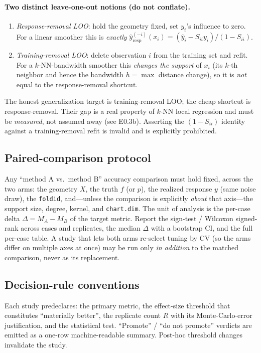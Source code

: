 \documentclass[11pt]{article}
\newcommand{\code}[1]{\texttt{#1}}
\begin{document}
\paragraph{Two distinct leave-one-out notions (do not conflate).}
\begin{enumerate}[leftmargin=1.4em]
\item \emph{Response-removal LOO}: hold the geometry fixed, set $y_i$'s influence to zero.
For a linear smoother this is \emph{exactly} $\hat y^{(-i)}_{\mathrm{resp}}(x_i)=(\hat y_i - S_{ii}y_i)/(1-S_{ii})$.
\item \emph{Training-removal LOO}: delete observation $i$ from the training set and refit.
For a $k$-NN-bandwidth smoother this \emph{changes the support} of $x_i$ (its $k$-th neighbor
and hence the bandwidth $h=\max$ distance change), so it is \emph{not} equal to the
response-removal shortcut.
\end{enumerate}
The honest generalization target is training-removal LOO; the cheap shortcut is
response-removal. Their gap is a real property of $k$-NN local regression and must be
\emph{measured}, not assumed away (see E0.3b). Asserting the $(1-S_{ii})$ identity against a
training-removal refit is invalid and is explicitly prohibited.

\subsection{Paired-comparison protocol}
\label{sec:paired}

Any ``method A vs.\ method B'' accuracy comparison must hold fixed, across the two arms:
the geometry $X$, the truth $f$ (or $p$), the realized response $y$ (same noise draw), the
\code{foldid}, and—unless the comparison is explicitly \emph{about} that axis—the support
size, degree, kernel, and \code{chart.dim}. The unit of analysis is the per-case delta
$\Delta = M_A - M_B$ of the target metric. Report the sign-test / Wilcoxon signed-rank
across cases and replicates, the median $\Delta$ with a bootstrap CI, and the full per-case
table. A study that lets both arms re-select tuning by CV (so the arms differ on multiple
axes at once) may be run only \emph{in addition} to the matched comparison, never as its
replacement.

\subsection{Decision-rule conventions}
\label{sec:decision}

Each study predeclares: the primary metric, the effect-size threshold that constitutes
``materially better'', the replicate count $R$ with its Monte-Carlo-error justification, and
the statistical test. ``Promote'' / ``do not promote'' verdicts are emitted as a one-row
machine-readable summary. Post-hoc threshold changes invalidate the study.
\end{document}
